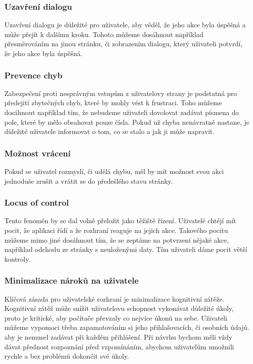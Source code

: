 \subsubsection*{Uzavření dialogu}
Uzavření dialogu je důležité pro uživatele, aby věděl, že jeho akce byla úspěšná a může přejít k dalšímu kroku. Tohoto můžeme dosáhnout například přesměrováním na jinou stránku, či zobrazením dialogu, který uživateli potvrdí, že jeho akce byla úspěšná.
\pagebreak

\subsubsection*{Prevence chyb}
Zabezpečení proti nesprávným vstupům z uživatelovy strany je podstatná pro předejití zbytečných chyb, které by mohly vést k frustraci. Toho můžeme dosáhnout například tím, že nebudeme uživateli dovolovat zadávat písmena do pole, které by mělo obsahovat pouze čísla. Pokud už chyba nenávratně nastane, je důležité uživatele informovat o tom, co se stalo a jak ji může napravit.

\subsubsection*{Možnost vrácení}
Pokud se uživatel rozmyslí, či udělá chybu, měl by mít možnost svou akci jednoduše zrušit a vrátit se do předešlého stavu stránky.

\subsubsection*{Locus of control}
Tento fenomén by se dal volně přeložit jako těžiště řízení. Uživatelé chtějí mít pocit, že aplikaci řídí a že rozhraní reaguje na jejich akce. Takového pocitu můžeme mimo jiné dosáhnout tím, že se zeptáme na potvrzení nějaké akce, například odchodu ze stránky s neuloženými daty. Tím uživateli dáme pocit větší kontroly.

\subsubsection*{Minimalizace nároků na uživatele}
Klíčová zásada pro uživatelské rozhraní je minimalizace kognitivní zátěže. Kognitivní zátěž může snížit uživatelovu schopnost vykonávat důležité úkoly, proto je kritické, aby počítače převzaly co nejvíce úkonů na sebe. Uživateli můžeme vypomoci třeba zapamatováním si jeho přihlašovacích, či osobních údajů. aby je nemusel zadávat při každém přihlášení. Při návrhu bychom měli vždy dávat přednost rozpoznání před vzpomínáním, abychom uživatelům umožnili rychle a bez problémů dokončit své úkoly.

